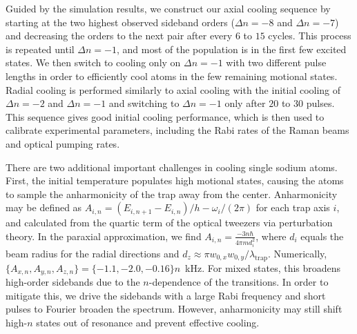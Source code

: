 \documentclass[aps,prl,twocolumn,groupedaddress]{revtex4-1}
\begin{document}
Guided by the simulation results,
we construct our axial cooling sequence by starting at the two highest
observed sideband orders ($\Delta n=-8$ and $\Delta n=-7$)
and decreasing the orders to the next pair after every $6$ to $15$ cycles.
This process is repeated until $\Delta n=-1$, and most of the
population is in the first few excited states. We then switch to cooling only on $\Delta n=-1$ with two different pulse lengths in order to efficiently cool atoms in the
few remaining motional states.
Radial cooling is performed similarly to axial cooling with the initial cooling of $\Delta n=-2$ and $\Delta n=-1$ and switching to $\Delta n=-1$ only after $20$ to $30$ pulses.
This sequence gives good initial cooling performance, which is then used to calibrate experimental
parameters, including the Rabi rates of the Raman beams and optical pumping rates.

There are two additional important challenges in cooling single sodium atoms.
First, the initial temperature populates high motional states,
causing the atoms to sample the anharmonicity of the trap away from the center. Anharmonicity may be defined as $A_{i,n}=(E_{i,n+1}-E_{i,n})/h - \omega_i/(2\pi)$ for each trap axis $i$, and calculated from the quartic term of the optical tweezers via perturbation theory.
In the paraxial approximation, we find $A_{i,n}=\frac{-3n\hbar}{4\pi m d_i^2}$, where $d_i$ equals the beam radius for the radial directions and $d_z\approx\pi w_{0,x}w_{0,y}/\lambda_{\textrm{trap}}$.
Numerically, $\{A_{x,n},A_{y,n},A_{z,n}\}=\{-1.1, -2.0, -0.16\}n$~kHz. For mixed states, this broadens high-order sidebands due to the $n$-dependence of the transitions.
In order to mitigate this, we drive the sidebands with a large Rabi frequency
and short pulses to Fourier broaden the spectrum. %
However, anharmonicity may still shift high-$n$ states out of resonance and prevent effective cooling.
\end{document}
